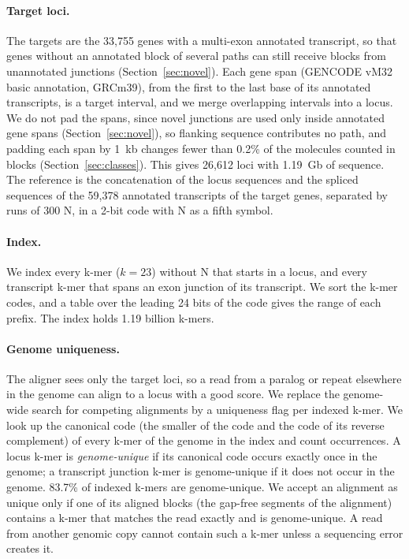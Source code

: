 \documentclass[11pt]{article}
\begin{document}
\paragraph{Target loci.} The targets are the 33{,}755 genes with a multi-exon annotated transcript, so that genes without an annotated block of several paths can still receive blocks from unannotated junctions (Section~\ref{sec:novel}). Each gene span (GENCODE vM32 basic annotation, GRCm39), from the first to the last base of its annotated transcripts, is a target interval, and we merge overlapping intervals into a locus. We do not pad the spans, since novel junctions are used only inside annotated gene spans (Section~\ref{sec:novel}), so flanking sequence contributes no path, and padding each span by 1~kb changes fewer than 0.2\% of the molecules counted in blocks (Section~\ref{sec:classes}). This gives 26{,}612 loci with 1.19~Gb of sequence. The reference is the concatenation of the locus sequences and the spliced sequences of the 59{,}378 annotated transcripts of the target genes, separated by runs of 300 N, in a 2-bit code with N as a fifth symbol.

\paragraph{Index.} We index every k-mer ($k=23$) without N that starts in a locus, and every transcript k-mer that spans an exon junction of its transcript. We sort the k-mer codes, and a table over the leading 24 bits of the code gives the range of each prefix. The index holds 1.19 billion k-mers.

\paragraph{Genome uniqueness.} The aligner sees only the target loci, so a read from a paralog or repeat elsewhere in the genome can align to a locus with a good score. We replace the genome-wide search for competing alignments by a uniqueness flag per indexed k-mer. We look up the canonical code (the smaller of the code and the code of its reverse complement) of every k-mer of the genome in the index and count occurrences. A locus k-mer is \emph{genome-unique} if its canonical code occurs exactly once in the genome; a transcript junction k-mer is genome-unique if it does not occur in the genome. 83.7\% of indexed k-mers are genome-unique. We accept an alignment as unique only if one of its aligned blocks (the gap-free segments of the alignment) contains a k-mer that matches the read exactly and is genome-unique. A read from another genomic copy cannot contain such a k-mer unless a sequencing error creates it.
\end{document}
